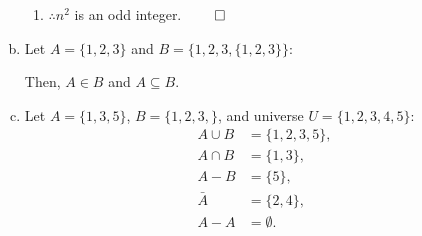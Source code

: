 \documentclass[12pt,letterpaper]{article}
\begin{document}
\begin{enumerate}[a)]
\begin{enumerate}[1.]
        \item
        $\therefore n^2$ is an odd integer. $\qed$
    \end{enumerate}



    \item Let $A = \{1,2,3\}$ and $B = \{1,2,3,\{1,2,3\}\}$:

    Then, $A \in B$ and $A \subseteq B$.

    \item Let $A = \{1, 3, 5\}$, $B = \{1,2,3,\}$, and universe $U = \{1,2,3,4,5\}$:
    \begin{align*}
        A \cup B    &= \{1,2,3,5\}, \\
        A \cap B    &= \{1,3\}, \\
        A - B       &= \{5\},\\
        \bar{A}     &= \{2,4\},\\
        A - A       &= \emptyset .
    \end{align*}

\end{enumerate}
\end{document}
